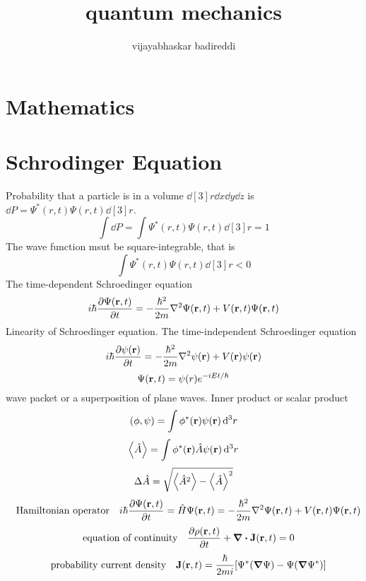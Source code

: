 \documentclass[12pt]{article}
\title{quantum mechanics}
\author{vijayabhaskar badireddi}
\begin{document}
\section{Mathematics}
\section{Schrodinger Equation}
Probability that a particle is in a volume $\dd[3]{r}\dd{x}\dd{y}\dd{z}$ is $\dd{P}=\Psi^*(r,t)\Psi(r,t)\dd[3]{r}$.
\[\int\dd{P}=\int\Psi^*(r,t)\Psi(r,t)\dd[3]{r}=1\] 
The wave function msut be square-integrable, that is \[\int\Psi^*(r,t)\Psi(r,t)\dd[3]{r}<0\]
The time-dependent Schroedinger equation \[i\hbar\pdv{\Psi(\vb{r},t)}{t}=-\frac{\hbar^2}{2m}\laplacian{\Psi(\vb{r},t)}+V(\vb{r},t)\Psi(\vb{r},t)\]
Linearity of Schroedinger equation.
The time-independent Schroedinger equation \[i\hbar\pdv{\psi(\vb{r})}{t}=-\frac{\hbar^2}{2m}\laplacian{\psi(\vb{r})}+V(\vb{r})\psi(\vb{r})\]
\[\Psi(\vb{r},t)=\psi(r)e^{-iEt/\hbar}\]
wave packet or a superposition of plane waves.
Inner product or scalar product\[(\phi,\psi)=\int\phi^*(\vb{r})\psi(\vb{r})\dd[3]{r}\]
\[\expval{\hat{A}}=\int\phi^*(\vb{r})\hat{A}\psi(\vb{r})\dd[3]{r}\]
\[\Delta{\hat{A}}=\sqrt{\expval{\hat{A}^2}-\expval{\hat{A}}^2}\]
\[\qq{Hamiltonian operator}i\hbar\pdv{\Psi(\vb{r},t)}{t}=\hat{H}\Psi(\vb{r},t)=-\frac{\hbar^2}{2m}\laplacian{\Psi(\vb{r},t)}+V(\vb{r},t)\Psi(\vb{r},t)\]
\[\qq{equation of continuity}\pdv{\rho(\vb{r},t)}{t}+\div{\vb{J}(\vb{r},t)}=0\]
\[\qq{probability current density}\vb{J}(\vb{r},t)=\frac{\hbar}{2mi}\qty[\Psi^*(\grad\Psi)-\Psi(\grad\Psi^*)]\]
\end{document}
